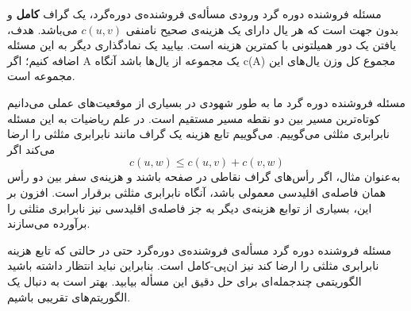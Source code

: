 \begin{itemframe}{مسئله فروشنده دوره گرد}
\itm
ورودی مسأله‌ی فروشنده‌ی دوره‌گرد، یک گراف \textbf{کامل} و بدون جهت است که هر یال دارای یک هزینه‌ی صحیح نامنفی
$c(u, v)$
می‌باشد. هدف، یافتن یک دور همیلتونی
با کمترین هزینه است.
\itm
بیایید یک نمادگذاری دیگر به این مسئله اضافه کنیم؛ اگر A یک مجموعه از یال‌ها باشد آنگاه c(A) مجموع کل وزن یال‌های این مجموعه است.
\end{itemframe}


\begin{itemframe}{مسئله فروشنده دوره گرد}
\itm
ما به طور شهودی در بسیاری از موقعیت‌های عملی می‌دانیم کوتاه‌ترین مسیر بین دو نقطه مسیر مستقیم است. در علم ریاضیات به این مسئله نابرابری مثلثی می‌گوییم.
\itm
می‌گوییم تابع هزینه یک گراف مانند نابرابری مثلثی را ارضا می‌کند اگر
$$
c(u, w) \leq c(u, v) + c(v, w)
$$
\itm
به‌عنوان مثال، اگر رأس‌های گراف نقاطی در صفحه باشند و هزینه‌ی سفر بین دو رأس همان فاصله‌ی اقلیدسی معمولی باشد، آنگاه نابرابری مثلثی برقرار است. افزون بر این، بسیاری از توابع هزینه‌ی دیگر به جز فاصله‌ی اقلیدسی نیز نا‌برابری مثلثی را برآورده می‌سازند.
\end{itemframe}


\begin{itemframe}{مسئله فروشنده دوره گرد}
\itm
مسأله‌ی فروشنده‌ی دوره‌گرد حتی در حالتی که تابع هزینه نابرابری مثلثی را ارضا کند نیز ان‌پی-کامل است. بنابراین نباید انتظار داشته باشید الگوریتمی چندجمله‌ای برای حل دقیق این مسأله بیابید. بهتر است به دنبال یک الگوریتم‌های تقریبی باشیم.
\end{itemframe}


